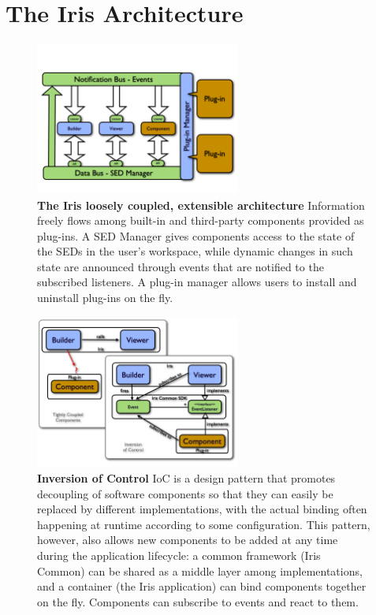 \documentclass[final,5p]{elsarticle}
\begin{document}
\section{The Iris Architecture}
\label{sec:architecture}

\begin{figure}
\begin{center}
\includegraphics[width=0.6\textwidth]{figures/IrisDiagrams.001.png}
\caption{\textbf{The Iris loosely coupled, extensible architecture} Information freely flows among built-in and third-party components provided as plug-ins. A SED Manager gives components access to the state of the SEDs in the user's workspace, while dynamic changes in such state are announced through events that are notified to the subscribed listeners. A plug-in manager allows users to install and uninstall plug-ins on the fly.}
\label{fig:architecture}
\end{center}
\end{figure}

\begin{figure}
\begin{center}
\includegraphics[width=0.6\textwidth]{figures/IrisDiagrams.003.png}
\caption{\textbf{Inversion of Control} IoC is a design pattern that promotes decoupling of software components so that they can easily be replaced by different implementations, with the actual binding often happening at runtime according to some configuration. This pattern, however, also allows new components to be added at any time during the application lifecycle: a common framework (Iris Common) can be shared as a middle layer among implementations, and a container (the Iris application) can bind components together on the fly. Components can subscribe to events and react to them.}
\label{fig:ioc}
\end{center}
\end{figure}
\end{document}
